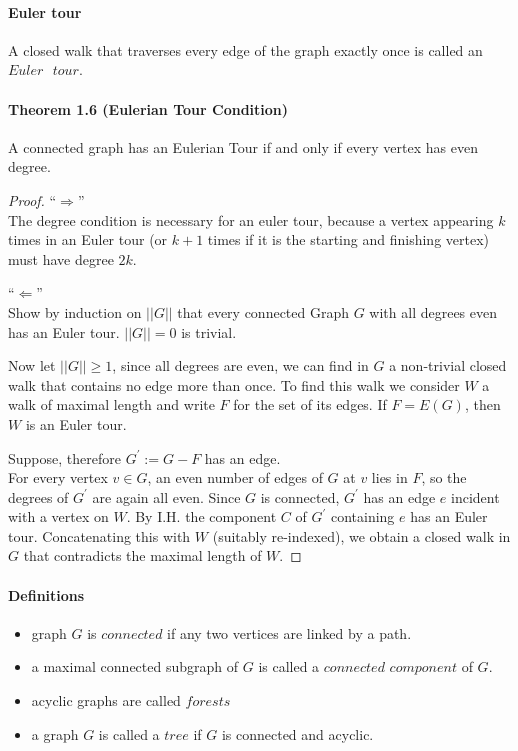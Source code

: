 \paragraph{Euler tour} A closed walk that traverses every edge of the graph 
exactly once is called an $ Euler \text{ }tour $.
\paragraph{Theorem 1.6 (Eulerian Tour Condition)} A connected graph has an Eulerian 
Tour if and only if every vertex has even degree.
\begin{proof}
   \enquote{$\Rightarrow$} \\ 
   The degree condition is necessary for an euler tour, because a vertex appearing
   $ k $ times in an Euler tour (or $ k + 1 $ times if it is the starting and 
   finishing vertex) must have degree $ 2k $.

   \smallskip
   \noindent\enquote{$\Leftarrow$} \\
   Show by induction on $ ||G|| $ that every connected Graph $ G $ with all degrees
   even has an Euler tour. $ ||G|| = 0 $ is trivial. 

   \smallskip
   Now let $ ||G|| \geq 1 $, since all degrees are even, we can find in $ G $
   a non-trivial closed walk that contains no edge more than once. To find this 
   walk we consider $ W $ a walk of maximal length and write $ F $ for 
   the set of its edges. If $ F = E(G) $, then $ W $ is an Euler tour.
   
   \smallskip
   Suppose, therefore $ G^\prime := G - F $ has an edge. \\
   For every vertex $ v \in G $, an even number of edges of $ G $ at $ v $ lies 
   in $ F $, so the degrees of $ G^\prime $ are again all even.
   Since $ G $ is connected, $ G^\prime $ has an edge $ e $ incident with a vertex on
   $ W $. By I.H. the component $ C $ of $ G^\prime $ containing $ e $ has an Euler
   tour. Concatenating this with $ W $ (suitably re-indexed), we obtain a closed walk
   in $ G $ that contradicts the maximal length of $ W.$

   \end{proof}


\paragraph{Definitions}
\begin{itemize}
    \item graph $ G $ is $ connected $ if any two vertices are linked by a path. 
    \item a maximal connected subgraph of $ G $ is called a $ connected $ 
    $ component $ of $ G$.
    \item acyclic graphs are called $ forests $
    \item a graph $ G $ is called a $ tree $ if $ G $ is connected and acyclic.
\end{itemize}

